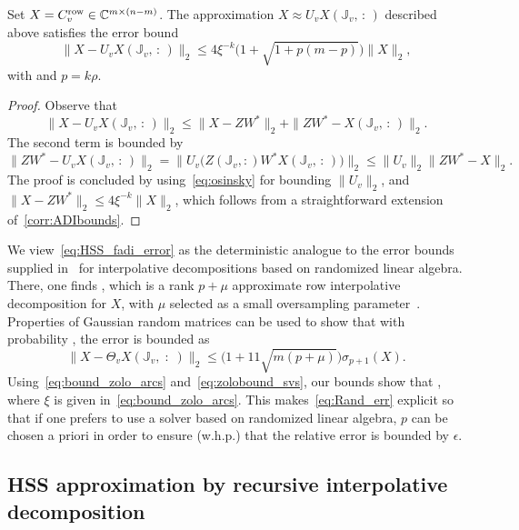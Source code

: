 \begin{lemma} 
\label{lemma:int_decomp_error_leaf}
Set $X = C_v^{\mathrm{row}} \in \mathbb{C}^{m \times (n-m)}$.
The approximation $X \approx U_v X(\mathbb{J}_v, \, : \,)$ described above satisfies the error bound
\begin{equation} 
\label{eq:HSS_fadi_error}
\|X - U_v X(\mathbb{J}_v, \, : \,)\|_2 \leq 4 \xi^{-k} \big( 1 + \sqrt{1+p(m-p)}\big) \|X\|_2,
\end{equation}
with  and $p = k \rho$.
\end{lemma}
\begin{proof}
Observe that
$$ \|X - U_v X(\mathbb{J}_v, \, : \,)\|_2 \leq  \|X - ZW^*\|_2 + \|ZW^* - X(\mathbb{J}_v, \, : \,)\|_2.$$
The second term is bounded by
\[
 \|ZW^* - U_v X(\mathbb{J}_v, \, : \,)\|_2
 = \big\|
 U_v \big(
 Z(\mathbb J_v,:) W^* X(\mathbb{J}_v, \, : \,)
 \big) 
 \big\|_2 \le \|U_v\|_2\|  ZW^* - X  \|_2.
\]
The proof is concluded by using~\eqref{eq:osinsky} for bounding $\|U_v\|_2$, and $\|X - ZW^*\|_2 \leq 4 \xi^{-k} \|X\|_2$,
which follows from a straightforward extension of~\cref{corr:ADIbounds}.
\end{proof}


We view~\eqref{eq:HSS_fadi_error} as the deterministic analogue to the error bounds supplied in~\cite[Eq.~3.6]{xia2012superfast} for interpolative decompositions based on randomized linear algebra. There, one finds  , which is a rank $p + \mu$ approximate row interpolative decomposition for $X$, with $\mu$ selected as a small  oversampling parameter~\cite{halko2011finding}. Properties of Gaussian random matrices can be used to show that with probability , the error is bounded as~\cite[Eq.~(3.6)]{xia2012superfast} 
\begin{equation} 
\label{eq:Rand_err}
\|X - \Theta_v X(\mathbb J_v, \; : \;)\|_2 \leq \big( 1 + 11 \sqrt{m(p + \mu)}\big) \sigma_{p+1}(X). 
\end{equation}
Using~\eqref{eq:bound_zolo_arcs} and~\eqref{eq:zolobound_svs}, our bounds show that , where $\xi$ is given in~\eqref{eq:bound_zolo_arcs}. This makes~\eqref{eq:Rand_err} explicit so that if one prefers to use a solver based on randomized linear algebra, $p$ can be chosen a priori in order to ensure (w.h.p.) that the relative error is bounded by $\epsilon$. 


\subsection{HSS approximation by recursive interpolative decomposition}
\label{sec:merge}

